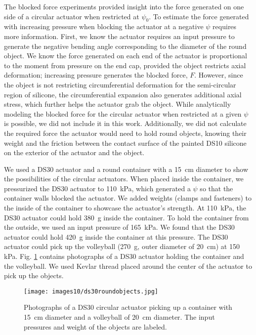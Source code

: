 The blocked force experiments provided insight into the force generated on one side of a circular actuator when restricted at $\psi_0$. To estimate the force generated with increasing pressure when blocking the actuator at a negative $\psi$ requires more information. First, we know the actuator requires an input pressure to generate the negative bending angle corresponding to the diameter of the round object. We know the force generated on each end of the actuator is proportional to the moment from pressure on the end cap, provided the object restricts axial deformation; increasing pressure generates the blocked force, $F$. However, since the object is not restricting circumferential deformation for the semi-circular region of silicone, the circumferential expansion also generates additional axial stress, which further helps the actuator grab the object. While analytically modeling the blocked force for the circular actuator when restricted at a given $\psi$ is possible, we did not include it in this work. Additionally, we did not calculate the required force the actuator would need to hold round objects, knowing their weight and the friction between the contact surface of the painted DS10 silicone on the exterior of the actuator and the object. 

We used a DS30 actuator and a round container with a 15~cm diameter to show the possibilities of the circular actuators. When placed inside the container, we pressurized the DS30 actuator to 110~kPa, which generated a $\psi$ so that the container walls blocked the actuator. We added weights (clamps and fasteners) to the inside of the container to showcase the actuator's strength. At 110~kPa, the DS30 actuator could hold 380~g inside the container. To hold the container from the outside, we used an input pressure of 165~kPa. We found that the DS30 actuator could hold 420~g inside the container at this pressure. The DS30 actuator could pick up the volleyball (270~g, outer diameter of 20~cm) at 150 kPa. Fig. \ref{fig:ds30roundobjects} contains photographs of a DS30 actuator holding the container and the volleyball. We used Kevlar thread placed around the center of the actuator to pick up the objects. 
\\
\begin{figure}[!ht]
    \centering
     \texttt{[image: images10/ds30roundobjects.jpg]}
    \caption{Photographs of a DS30 circular actuator picking up a container with 15~cm diameter and a volleyball of 20~cm diameter. The input pressures and weight of the objects are labeled.}
    \label{fig:ds30roundobjects}
\end{figure}

